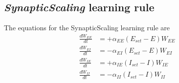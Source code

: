 \documentclass[
twocolumn,
]{article}
\newcommand{\EE}{\mathit{EE}}
\newcommand{\EI}{\mathit{EI}}
\newcommand{\IE}{\mathit{IE}}
\newcommand{\II}{\mathit{II}}
\newcommand{\set}{\mathit{set}}
\newcommand{\up}{\mathit{up}}
\begin{document}




\subsection{{\em SynapticScaling} learning rule}

The equations for the SynapticScaling learning rule are
\begin{equation}
\begin{aligned}
\frac{dW_{\EE}}{dt} & = +\alpha_{\EE} (E_{\set} - E) W_{\EE} \\
\frac{dW_{\EI}}{dt} & = -\alpha_{\EI} (E_{\set} - E) W_{\EI} \\
\frac{dW_{\IE}}{dt} & = +\alpha_{\IE} (I_{\set} - I) W_{\IE} \\
\frac{dW_{\II}}{dt} & = -\alpha_{\II} (I_{\set} - I) W_{\II}
\end{aligned}
\label{eq.SS_summary}
\end{equation}
\end{document}
